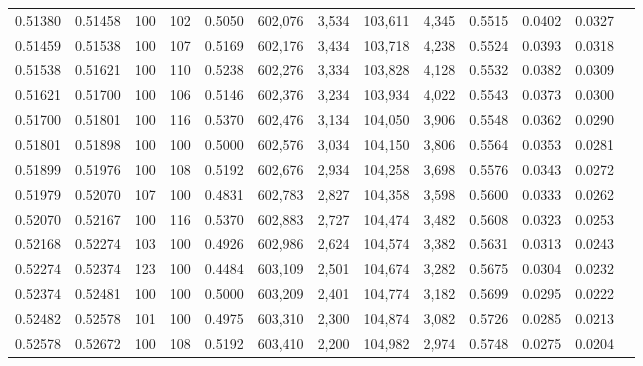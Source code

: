 \begin{tabular}{rrrrrrrrrrrrr}
0.51380 & 0.51458 &   100 & 102 &                                     0.5050 & 602,076 &   3,534 & 103,611 &   4,345 & 0.5515 & 0.0402 & 0.0327 \\
0.51459 & 0.51538 &   100 & 107 &                                     0.5169 & 602,176 &   3,434 & 103,718 &   4,238 & 0.5524 & 0.0393 & 0.0318 \\
0.51538 & 0.51621 &   100 & 110 &                                     0.5238 & 602,276 &   3,334 & 103,828 &   4,128 & 0.5532 & 0.0382 & 0.0309 \\
0.51621 & 0.51700 &   100 & 106 &                                     0.5146 & 602,376 &   3,234 & 103,934 &   4,022 & 0.5543 & 0.0373 & 0.0300 \\
0.51700 & 0.51801 &   100 & 116 &                                     0.5370 & 602,476 &   3,134 & 104,050 &   3,906 & 0.5548 & 0.0362 & 0.0290 \\
0.51801 & 0.51898 &   100 & 100 &                                     0.5000 & 602,576 &   3,034 & 104,150 &   3,806 & 0.5564 & 0.0353 & 0.0281 \\
0.51899 & 0.51976 &   100 & 108 &                                     0.5192 & 602,676 &   2,934 & 104,258 &   3,698 & 0.5576 & 0.0343 & 0.0272 \\
0.51979 & 0.52070 &   107 & 100 &                                     0.4831 & 602,783 &   2,827 & 104,358 &   3,598 & 0.5600 & 0.0333 & 0.0262 \\
0.52070 & 0.52167 &   100 & 116 &                                     0.5370 & 602,883 &   2,727 & 104,474 &   3,482 & 0.5608 & 0.0323 & 0.0253 \\
0.52168 & 0.52274 &   103 & 100 &                                     0.4926 & 602,986 &   2,624 & 104,574 &   3,382 & 0.5631 & 0.0313 & 0.0243 \\
0.52274 & 0.52374 &   123 & 100 &                                     0.4484 & 603,109 &   2,501 & 104,674 &   3,282 & 0.5675 & 0.0304 & 0.0232 \\
0.52374 & 0.52481 &   100 & 100 &                                     0.5000 & 603,209 &   2,401 & 104,774 &   3,182 & 0.5699 & 0.0295 & 0.0222 \\
0.52482 & 0.52578 &   101 & 100 &                                     0.4975 & 603,310 &   2,300 & 104,874 &   3,082 & 0.5726 & 0.0285 & 0.0213 \\
0.52578 & 0.52672 &   100 & 108 &                                     0.5192 & 603,410 &   2,200 & 104,982 &   2,974 & 0.5748 & 0.0275 & 0.0204 \\

\end{tabular}

